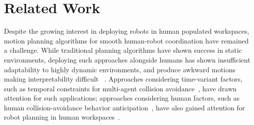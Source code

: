 \documentclass[letterpaper, 10 pt, conference]{ieeeconf}  %
\begin{document}



\section{Related Work}
Despite the growing interest in deploying robots in human populated workspaces, 
motion planning algorithms for smooth human-robot coordination have remained a 
challenge. While traditional planning algorithms have shown success in static 
environments, deploying such approaches alongside humans has shown 
insufficient adaptability to highly dynamic environments, and produce awkward 
motions making 
interpretability difficult
~\cite{lichtenthaler2012influence,dragan2013legibility,kruse2012legible}. 
Approaches considering time-variant factors, such as temporal constraints for multi-agent collision 
avoidance~\cite{van2011reciprocal}, have drawn attention for such 
applications; approaches considering human factors, such as human 
collision-avoidance behavior anticipation~\cite{helbing1995social}, have also gained attention for robot planning in human workspaces~\cite{shiomi2014towards}.
\end{document}
